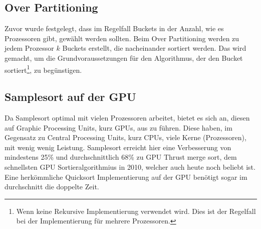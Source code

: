 	\subsection{Over Partitioning}
		Zuvor wurde festgelegt, dass im Regelfall Buckets in der Anzahl, wie es Prozessoren gibt, gewählt werden sollten.
		Beim Over Partitioning werden zu jedem Prozessor $k$ Buckets erstellt, die nacheinander sortiert werden.
		Das wird gemacht, um die Grundvoraussetzungen für den Algorithmus, der den Bucket sortiert\footnote{Wenn keine Rekursive Implementierung verwendet wird. Dies ist der Regelfall bei der Implementierung für mehrere Prozessoren.}, zu begünstigen.
	
	\subsection{Samplesort auf der GPU}
		Da Samplesort optimal mit vielen Prozessoren arbeitet, bietet es sich an, diesen auf Graphic Processing Units, kurz GPUs, aus zu führen.
		Diese haben, im Gegensatz zu Central Processing Units, kurz CPUs, viele Kerne (Prozessoren), mit wenig wenig Leistung. \autocite{wikipedia-contributors-2022B}
		Samplesort erreicht hier eine Verbesserung von mindestens 25\% und durchschnittlich 68\% zu GPU Thrust merge sort, \autocite{leischner-2010} dem schnellsten GPU Sortieralgorithmius in 2010, welcher auch heute noch beliebt ist. \autocite{unknown-author-2016}
		Eine herkömmliche Quicksort Implementierung auf der GPU benötigt sogar im durchschnitt die doppelte Zeit.
